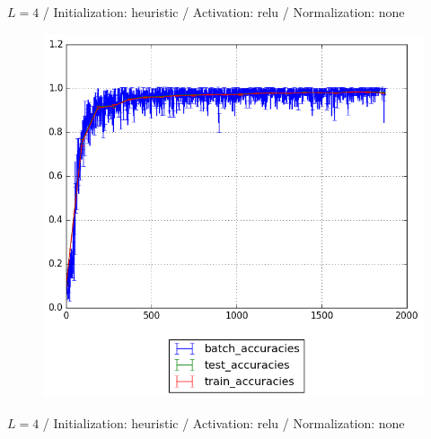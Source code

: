 \documentclass{beamer}
\begin{document}
{	%
	\begin{frame}[t]{}{}%
		\vfill
		\begin{center}
			{$L = 4$ / Initialization: heuristic / Activation: relu / Normalization: none}
		\end{center}
    		\begin{figure}
    			\centering
    			\includegraphics[scale=0.4]{gfx/l4b32_relu_heuristic_identity_cnn_accuracies}
    		\end{figure}
    		\vfill
	\end{frame}
	\begin{frame}[t]{}{}%
		\vfill
		\begin{center}
			{$L = 4$ / Initialization: heuristic / Activation: relu / Normalization: none}
		\end{center}
    		\begin{figure}
    			\centering

\end{figure}
\end{frame}}
\end{document}
